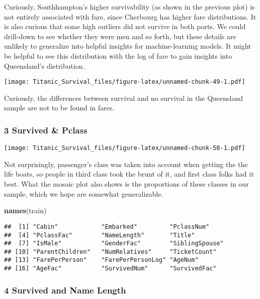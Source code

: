 \documentclass[]{article}
\newenvironment{Shaded}{\begin{snugshade}}{\end{snugshade}}
\newcommand{\KeywordTok}[1]{\textcolor[rgb]{0.13,0.29,0.53}{\textbf{#1}}}
\newcommand{\NormalTok}[1]{#1}
\begin{document}
Curiously, Southhampton's higher survivability (as shown in the previous
plot) is not entirely associated with fare, since Cherbourg has higher
fare distributions. It is also curious that some high outliers did not
survive in both ports. We could drill-down to see whether they were men
and so forth, but these details are unlikely to generalize into helpful
insights for machine-learning models. It might be helpful to see this
distribution with the log of fare to gain insights into Queensland's
distribution.

\texttt{[image: Titanic\_Survival\_files/figure-latex/unnamed-chunk-49-1.pdf]}

Curiously, the differences between survival and no survival in the
Queensland sample are not to be found in fares.

\subsubsection{3 Survived \& Pclass}\label{survived-pclass}

\texttt{[image: Titanic\_Survival\_files/figure-latex/unnamed-chunk-50-1.pdf]}

Not surprisingly, passenger's class was taken into account when getting
the the life boats, so people in third class took the brunt of it, and
first class folks had it best. What the mosaic plot also shows is the
proportions of these classes in our sample, which we hope are somewhat
generalizable.

\begin{Shaded}
\begin{Highlighting}[]
\KeywordTok{names}\NormalTok{(train)}
\end{Highlighting}
\end{Shaded}

\begin{verbatim}
##  [1] "Cabin"            "Embarked"         "PclassNum"       
##  [4] "PclassFac"        "NameLength"       "Title"           
##  [7] "IsMale"           "GenderFac"        "SiblingSpouse"   
## [10] "ParentChildren"   "NumRelatives"     "TicketCount"     
## [13] "FarePerPerson"    "FarePerPersonLog" "AgeNum"          
## [16] "AgeFac"           "SurvivedNum"      "SurvivedFac"
\end{verbatim}

\subsubsection{4 Survived and Name
Length}\label{survived-and-name-length}
\end{document}
